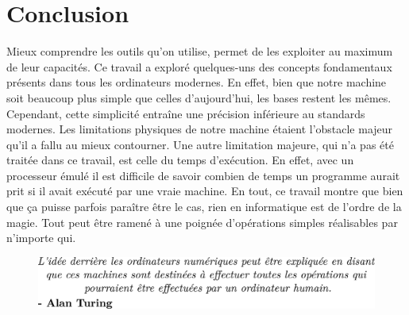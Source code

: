 \documentclass{article}
\begin{document}
\section{Conclusion}
Mieux comprendre les outils qu'on utilise, permet de les exploiter au maximum de leur capacités. Ce travail a exploré quelques-uns des concepts fondamentaux présents dans tous les ordinateurs modernes. En effet, bien que notre machine soit beaucoup plus simple que celles d'aujourd'hui, les bases restent les mêmes. Cependant, cette simplicité entraîne une précision inférieure au standards modernes. Les limitations physiques de notre machine étaient l'obstacle majeur qu'il a fallu au mieux contourner. Une autre limitation majeure, qui n'a pas été traitée dans ce travail, est celle du temps d’exécution. En effet, avec un processeur émulé il est difficile de savoir combien de temps un programme aurait prit si il avait exécuté par une vraie machine. En tout, ce travail montre que bien que ça puisse parfois paraître être le cas, rien en informatique est de l'ordre de la magie. Tout peut être ramené à une poignée d'opérations simples réalisables par n'importe qui.
\vspace{2cm}
\begin{figure}[htp]
    \centering
    \includegraphics[width=12cm]{images/quote.png}
    \label{fig:quote}
\end{figure}

\newpage
\printbibliography
\end{document}
